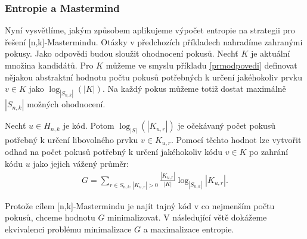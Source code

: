 \subsubsection{Entropie a Mastermind}
Nyní vysvětlíme, jakým způsobem aplikujeme výpočet entropie na strategii pro řešení [n,k]-Mastermindu. Otázky v předchozích příkladech nahradíme zahranými pokusy. Jako odpovědi budou sloužit ohodnocení pokusů. Nechť $K$ je aktuální množina kandidátů. Pro $K$ můžeme ve smyslu příkladu \ref{prmodpovedi} definovat nějakou abstraktní hodnotu počtu pokusů potřebných k určení jakéhokoliv prvku  $v \in K$ jako $\log_{|S_{n,k}|}(|K|)$. Na každý pokus můžeme totiž dostat maximálně $|S_{n,k}|$ možných ohodnocení. 

Nechť $u \in H_{n,k}$ je kód. 
Potom $\log_{|S|}(|K_{u,r}|)$ je očekávaný počet pokusů potřebný k určení libovolného prvku $v \in K_{u,r}$. Pomocí těchto hodnot lze vytvořit odhad na počet pokusů potřebný k určení jakéhokoliv kódu $v \in K$ po zahrání kódu $u$ jako jejich vážený průměr:
\begin{align}\label{rceocekavanypocetpokusu}
    G = \sum_{r\in S_{n,k}, |K_{u,r}| > 0} \frac{|K_{u,r}|}{|K|}\log_{|S_{n,k}|}|K_{u,r}|.
\end{align}



Protože cílem [n,k]-Mastermindu je najít tajný kód v co nejmenším počtu pokusů, chceme hodnotu $G$ minimalizovat. V následující větě dokážeme ekvivalenci problému minimalizace $G$ a maximalizace entropie. 


